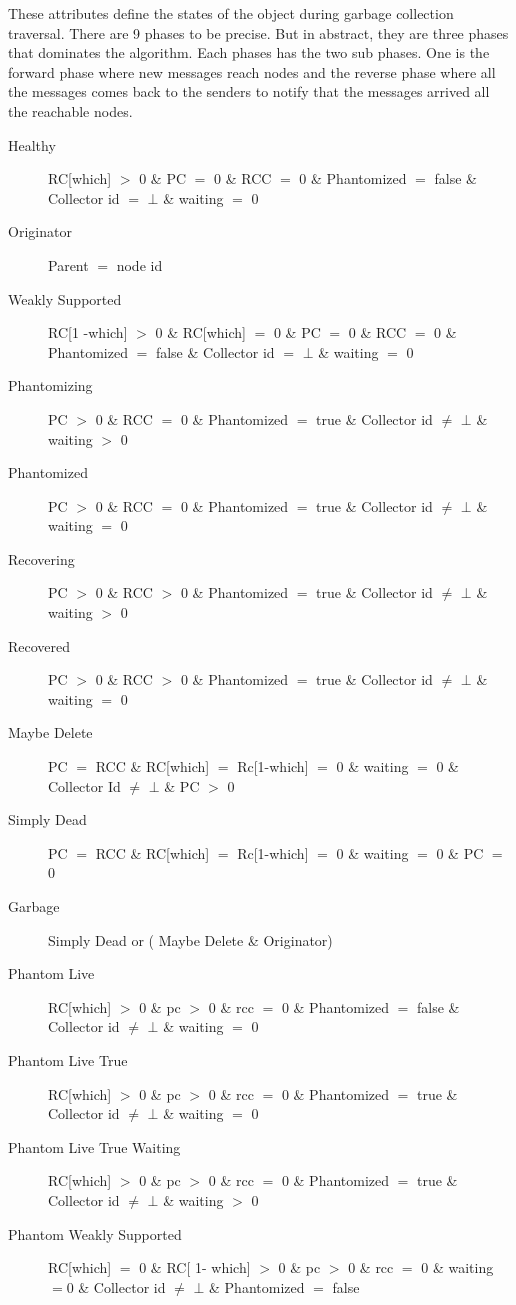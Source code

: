 \documentclass{article}
\begin{document}
These attributes define the states of the object during garbage collection traversal. There are 9 phases to be precise. But in abstract, they are three phases that dominates the algorithm. Each phases has the two sub phases. One is the forward phase where new messages reach nodes and the reverse phase where all the messages comes back to the senders to notify that the messages arrived all the reachable nodes. 
\begin{description}
  \item[Healthy] RC[which] $>$ 0 \& PC $=$ 0 \& RCC $=$ 0 \& Phantomized $=$ false \& Collector id $=$ $\bot$ \& waiting $=$ 0
  \item[Originator] Parent $=$ node id 
  \item[Weakly Supported] RC[1 -which] $>$ 0 \& RC[which] $=$ 0 \& PC $=$ 0 \& RCC $=$ 0 \& Phantomized $=$ false \& Collector id $=$ $\bot$ \& waiting $=$ 0
  \item[Phantomizing] PC $>$ 0 \& RCC $=$ 0 \& Phantomized $=$ true \& Collector id $\neq$ $\bot$ \& waiting $>$ 0
  \item[Phantomized] PC $>$ 0 \& RCC $=$ 0 \& Phantomized $=$ true \& Collector id $\neq$ $\bot$ \& waiting $=$ 0
   \item[Recovering] PC $>$ 0 \& RCC $>$ 0 \& Phantomized $=$ true \& Collector id $\neq$ $\bot$ \& waiting $>$ 0
   \item[Recovered] PC $>$ 0 \& RCC $>$ 0 \& Phantomized $=$ true \& Collector id $\neq$ $\bot$ \& waiting $=$ 0
  \item[Maybe Delete] PC $=$ RCC \& RC[which] $=$ Rc[1-which] $=$ 0 \& waiting $=$ 0 \& Collector Id $\neq$ $\bot$ \& PC $>$ 0
  	\item [Simply Dead] PC $=$ RCC \& RC[which] $=$ Rc[1-which] $=$ 0 \& waiting $=$ 0 \& PC $=$ 0 
  	\item [Garbage] Simply Dead or  ( Maybe Delete \& Originator)
  \item[Phantom Live] RC[which] $>$ 0 \& pc $>$ 0 \& rcc $=$ 0 \& Phantomized $=$ false \& Collector id $\neq$ $\bot$ \& waiting $=$ 0
 \item[Phantom Live True] RC[which] $>$ 0 \& pc $>$ 0 \& rcc $=$ 0 \& Phantomized $=$ true \& Collector id $\neq$ $\bot$ \& waiting $=$ 0
\item[Phantom Live True Waiting] RC[which] $>$ 0 \& pc $>$ 0 \& rcc $=$ 0 \& Phantomized $=$ true \& Collector id $\neq$ $\bot$ \& waiting $>$ 0
\item[Phantom Weakly Supported] RC[which] $=$ 0 \& RC[ 1- which] $>$ 0 \& pc $>$ 0 \& rcc $=$ 0 \& waiting $=$0 \& Collector id $\neq$ $\bot$ \& Phantomized $=$ false

\end{description}
\end{document}

